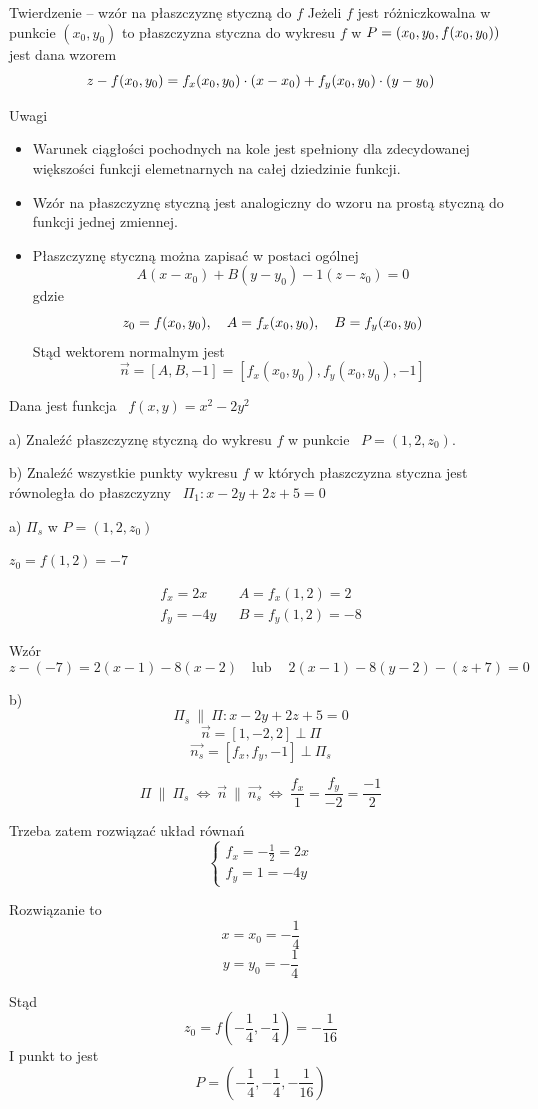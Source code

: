\begin{tw}{Twierdzenie -- wzór na płaszczyznę styczną do $f$}
    Jeżeli $f$ jest różniczkowalna w punkcie $(x_0, y_0)$ to płaszczyzna styczna do wykresu $f$ w $P = (x_0, y_0, f(x_0, y_0))$ jest dana wzorem
    \[ z - f(x_0, y_0) = f_x(x_0, y_0) \cdot (x - x_0) + f_y(x_0, y_0) \cdot (y - y_0) \]
\end{tw}

Uwagi 
\begin{itemize}
    \item Warunek ciągłości pochodnych na kole jest spełniony dla zdecydowanej większości funkcji elemetnarnych na całej dziedzinie funkcji.
    \item Wzór na płaszczyznę styczną jest analogiczny do wzoru na prostą styczną do funkcji jednej zmiennej.
    \item Płaszczyznę styczną można zapisać w postaci ogólnej
    \[ A(x - x_0) + B(y - y_0) - 1(z - z_0) = 0 \]
    gdzie
    \[ z_0 = f(x_0, y_0), \quad A = f_x(x_0, y_0), \quad B = f_y(x_0, y_0) \]
    Stąd wektorem normalnym jest
    \[ \vec{n} = [A, B, -1] = [f_x(x_0, y_0), f_y(x_0, y_0), -1] \] 
\end{itemize}

\begin{przykladbig}
    Dana jest funkcja \ $ f(x,y) = x^2 - 2y^2 $

    a) Znaleźć płaszczyznę styczną do wykresu $f$ w punkcie \ $ P = (1, 2, z_0) $.

    b) Znaleźć wszystkie punkty wykresu $f$ w których płaszczyzna styczna jest równoległa do płaszczyzny \ $ \Pi_1: x - 2y + 2z + 5 = 0 $
    \bigskip

    a) $ \Pi_s $ w $ P = (1, 2, z_0)$

    $ z_0 = f(1,2) = -7 $

    \[ \begin{array}{lll}
        f_x = 2x && A = f_x(1,2) = 2 \\
        f_y = -4y && B = f_y(1,2) = -8
    \end{array} \]

    Wzór 
    \[ z - (-7) = 2(x-1) - 8(x-2) \quad \text{lub} \quad \ 2(x-1) - 8(y-2) - (z+7) = 0 \]

    b)
    \[ \Pi_s \ \| \ \Pi : x - 2y + 2z + 5 = 0 \]
    \[ \vec{n} = [1,-2,2] \ \bot \ \Pi \]
    \[ \vec{n_s} = [f_x, f_y, -1] \ \bot \ \Pi_s \]

    \[ \Pi \ \| \ \Pi_s \ \Leftrightarrow \ \vec{n} \ \| \ \vec{n_s} \ \Leftrightarrow \ \frac{f_x}{1} = \frac{f_y}{-2} = \frac{-1}{2} \]

    Trzeba zatem rozwiązać układ równań
    \[ \begin{cases}
        f_x = -\frac{1}{2} = 2x \\
        f_y = 1 = -4y
    \end{cases} \]

    Rozwiązanie to
    \[ x = x_0 = -\frac{1}{4} \]
    \[ y = y_0 = -\frac{1}{4} \]

    Stąd
    \[ z_0 = f\left(-\frac{1}{4}, -\frac{1}{4}\right) = -\frac{1}{16} \]
    I punkt to jest
    \[ P = \left(-\frac{1}{4}, -\frac{1}{4}, -\frac{1}{16}\right) \]
\end{przykladbig}

